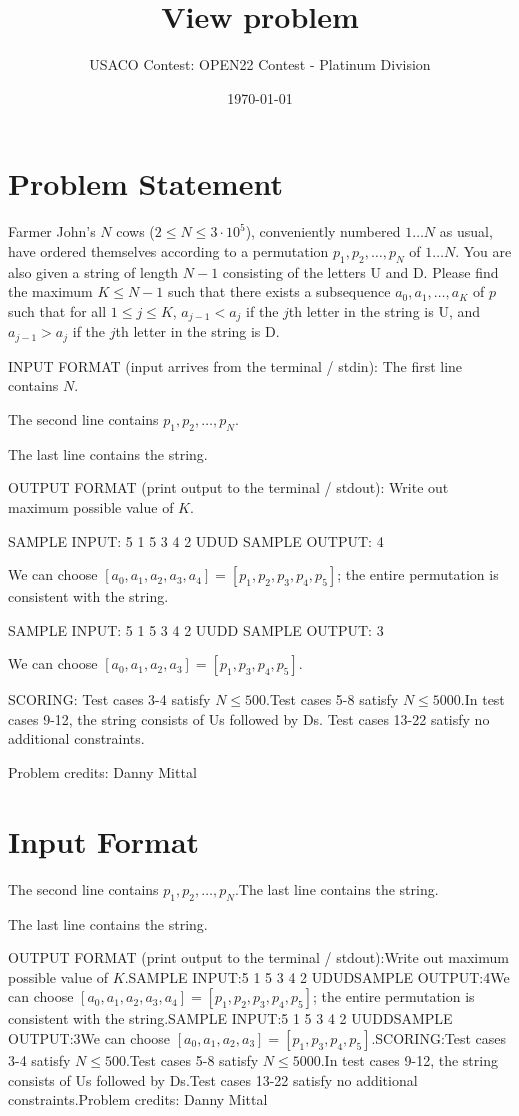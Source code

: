 \documentclass[12pt]{article}
\title{View problem}
\author{USACO Contest: OPEN22 Contest - Platinum Division}
\date{\today}
\begin{document}
\maketitle

\section*{Problem Statement}

Farmer John's $N$ cows ($2 \leq N \leq 3\cdot 10^5$), conveniently numbered $1 \ldots N$ as usual, have ordered themselves according to a  permutation
$p_1,p_2,\ldots,p_N$ of $1\ldots N$.  You are also
given a string of length $N-1$ consisting of the letters U and D. Please find the
maximum $K\le N-1$ such that there  exists a subsequence $a_0,a_1,\ldots,a_{K}$
of $p$ such that for all $1\le j\le K$, $a_{j - 1} < a_j$ if the $j$th letter in
the string is U, and $a_{j - 1} > a_j$ if the $j$th letter in the string is D.

INPUT FORMAT (input arrives from the terminal / stdin):
The first line contains $N$.

The second line contains $p_1,p_2,\ldots,p_N$.

The last line contains the string.

OUTPUT FORMAT (print output to the terminal / stdout):
Write out maximum possible value of $K$.

SAMPLE INPUT:
5
1 5 3 4 2
UDUD
SAMPLE OUTPUT: 
4

We can choose $[a_0,a_1,a_2,a_3,a_4]=[p_1,p_2,p_3,p_4,p_5]$; the entire
permutation is consistent with the string.

SAMPLE INPUT:
5
1 5 3 4 2
UUDD
SAMPLE OUTPUT: 
3

We can choose $[a_0,a_1,a_2,a_3]=[p_1,p_3,p_4,p_5]$.

SCORING:
Test cases 3-4 satisfy $N\le 500$.Test cases 5-8 satisfy $N\le 5000$.In test cases 9-12, the string consists of Us followed by Ds. Test cases 13-22 satisfy no additional constraints.


Problem credits: Danny Mittal



\section*{Input Format}
The second line contains $p_1,p_2,\ldots,p_N$.The last line contains the string.

The last line contains the string.

OUTPUT FORMAT (print output to the terminal / stdout):Write out maximum possible value of $K$.SAMPLE INPUT:5
1 5 3 4 2
UDUDSAMPLE OUTPUT:4We can choose $[a_0,a_1,a_2,a_3,a_4]=[p_1,p_2,p_3,p_4,p_5]$; the entire
permutation is consistent with the string.SAMPLE INPUT:5
1 5 3 4 2
UUDDSAMPLE OUTPUT:3We can choose $[a_0,a_1,a_2,a_3]=[p_1,p_3,p_4,p_5]$.SCORING:Test cases 3-4 satisfy $N\le 500$.Test cases 5-8 satisfy $N\le 5000$.In test cases 9-12, the string consists of Us followed by Ds.Test cases 13-22 satisfy no additional constraints.Problem credits: Danny Mittal
\end{document}
